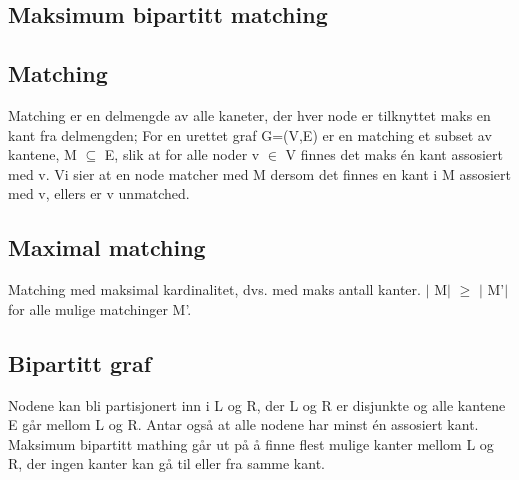 \documentclass[12pt]{report}
\begin{document}
\vspace{\baselineskip}

\vspace{\baselineskip}\subsection*{Maksimum bipartitt matching}
\subsection*{Matching}
Matching er en delmengde av alle kaneter, der hver node er tilknyttet maks en kant fra delmengden; For en urettet graf G=(V,E) er en matching et subset av kantene, M $ \subseteq $  E, slik at for alle noder v $ \in $  V finnes det maks én kant assosiert med v. Vi sier at en node matcher med M dersom det finnes en kant i M assosiert med v, ellers er v unmatched. \par

\subsection*{Maximal matching }
Matching med maksimal kardinalitet, dvs. med maks antall kanter. $ \vert $ M$ \vert $  $ \geq $  $ \vert $ M’$ \vert $  for alle mulige matchinger M’. \par

\subsection*{Bipartitt graf }
Nodene kan bli partisjonert inn i L og R, der L og R er disjunkte og alle kantene E går mellom L og R. Antar også at alle nodene har minst én assosiert kant. Maksimum bipartitt mathing går ut på å finne flest mulige kanter mellom L og R, der ingen kanter kan gå til eller fra samme kant.\par



\end{document}
